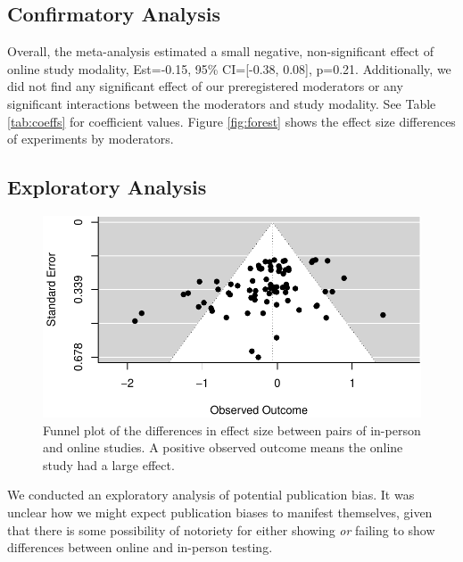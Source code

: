 \documentclass[
  man,floatsintext]{apa6}
\begin{document}
\hypertarget{confirmatory-analysis}{%
\subsection{Confirmatory Analysis}\label{confirmatory-analysis}}

Overall, the meta-analysis estimated a small negative, non-significant effect of online study modality, Est=-0.15, 95\% CI={[}-0.38, 0.08{]}, p=0.21. Additionally, we did not find any significant effect of our preregistered moderators or any significant interactions between the moderators and study modality. See Table \ref{tab:coeffs} for coefficient values. Figure \ref{fig:forest} shows the effect size differences of experiments by moderators.

\hypertarget{exploratory-analysis}{%
\subsection{Exploratory Analysis}\label{exploratory-analysis}}

\begin{figure}[h]

{\centering \includegraphics[width=0.8\linewidth]{OnlineMA_main_files/figure-latex/funnel-1} 

}

\caption{Funnel plot of the differences in effect size between pairs of in-person and online studies. A positive observed outcome means the online study had a large effect. \label{funnel}}\label{fig:funnel}
\end{figure}

We conducted an exploratory analysis of potential publication bias. It was unclear how we might expect publication biases to manifest themselves, given that there is some possibility of notoriety for either showing \emph{or} failing to show differences between online and in-person testing.
\end{document}
